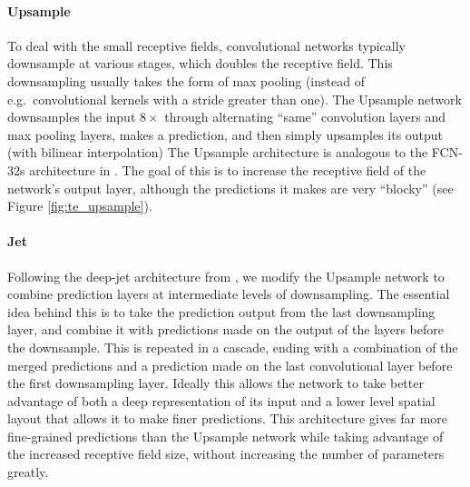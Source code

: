 \paragraph{Upsample}
To deal with the small receptive fields, convolutional networks typically downsample at various stages, which doubles the receptive field. 
This downsampling usually takes the form of max pooling (instead of e.g.\ convolutional kernels with a stride greater than one).
The Upsample network downsamples the input $8\times$ through alternating ``same'' convolution layers and max pooling layers, makes a prediction, and then simply upsamples its output (with bilinear interpolation)
The Upsample architecture is analogous to the FCN-32s architecture in \cite{long2015fully}.%
The goal of this is to increase the receptive field of the network's output layer, although the predictions it makes are very ``blocky'' (see Figure \ref{fig:te_upsample}).

\paragraph{Jet}
Following the deep-jet architecture from \cite{long2015fully}, we modify the Upsample network to combine prediction layers at intermediate levels of downsampling.
The essential idea behind this is to take the prediction output from the last downsampling layer, and combine it with predictions made on the output of the layers before the downsample.
This is repeated in a cascade, ending with a combination of the merged predictions and a prediction made on the last convolutional layer before the first downsampling layer.
Ideally this allows the network to take better advantage of both a deep representation of its input and a lower level spatial layout that allows it to make finer predictions.
This architecture gives far more fine-grained predictions than the Upsample network while taking advantage of the increased receptive field size, without increasing the number of parameters greatly.


